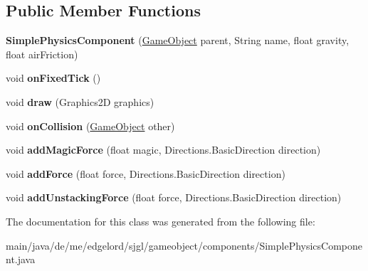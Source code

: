 \subsection*{Public Member Functions}
\begin{DoxyCompactItemize}
\item 
\mbox{\label{classde_1_1me_1_1edgelord_1_1sjgl_1_1gameobject_1_1components_1_1_simple_physics_component_ab85332de482799c92f6c8587f79699fd}} 
{\bfseries Simple\+Physics\+Component} (\mbox{\hyperlink{classde_1_1me_1_1edgelord_1_1sjgl_1_1gameobject_1_1_game_object}{Game\+Object}} parent, String name, float gravity, float air\+Friction)
\item 
\mbox{\label{classde_1_1me_1_1edgelord_1_1sjgl_1_1gameobject_1_1components_1_1_simple_physics_component_a7ad66f245f7af4c5d3c40d1539dca2d2}} 
void {\bfseries on\+Fixed\+Tick} ()
\item 
\mbox{\label{classde_1_1me_1_1edgelord_1_1sjgl_1_1gameobject_1_1components_1_1_simple_physics_component_a9d32336e18ee38fa5cae80e593681d49}} 
void {\bfseries draw} (Graphics2D graphics)
\item 
\mbox{\label{classde_1_1me_1_1edgelord_1_1sjgl_1_1gameobject_1_1components_1_1_simple_physics_component_ab76fef5130dab84e12add27eabc28aab}} 
void {\bfseries on\+Collision} (\mbox{\hyperlink{classde_1_1me_1_1edgelord_1_1sjgl_1_1gameobject_1_1_game_object}{Game\+Object}} other)
\item 
\mbox{\label{classde_1_1me_1_1edgelord_1_1sjgl_1_1gameobject_1_1components_1_1_simple_physics_component_a297d4683154a82512025dc31f4ad5018}} 
void {\bfseries add\+Magic\+Force} (float magic, Directions.\+Basic\+Direction direction)
\item 
\mbox{\label{classde_1_1me_1_1edgelord_1_1sjgl_1_1gameobject_1_1components_1_1_simple_physics_component_a3e354915fa16a1040669dc55a49bb81b}} 
void {\bfseries add\+Force} (float force, Directions.\+Basic\+Direction direction)
\item 
\mbox{\label{classde_1_1me_1_1edgelord_1_1sjgl_1_1gameobject_1_1components_1_1_simple_physics_component_ab708550c42d6158854db1884ab68baff}} 
void {\bfseries add\+Unstacking\+Force} (float force, Directions.\+Basic\+Direction direction)
\end{DoxyCompactItemize}


The documentation for this class was generated from the following file\+:\begin{DoxyCompactItemize}
\item 
main/java/de/me/edgelord/sjgl/gameobject/components/Simple\+Physics\+Component.\+java\end{DoxyCompactItemize}

